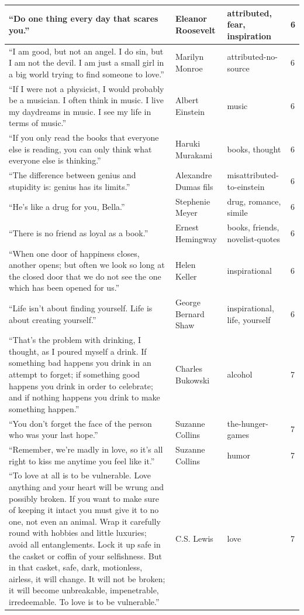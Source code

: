 \documentclass[
  letterpaper,
  DIV=11,
  numbers=noendperiod]{scrreprt}
\begin{document}
\begin{tabular}[t]{l|l|l|l}
\hline
“Do one thing every day that scares you.” & Eleanor Roosevelt & attributed, fear, inspiration & 6\\
\hline
“I am good, but not an angel. I do sin, but I am not the devil. I am just a small girl in a big world trying to find someone to love.” & Marilyn Monroe & attributed-no-source & 6\\
\hline
“If I were not a physicist, I would probably be a musician. I often think in music. I live my daydreams in music. I see my life in terms of music.” & Albert Einstein & music & 6\\
\hline
“If you only read the books that everyone else is reading, you can only think what everyone else is thinking.” & Haruki Murakami & books, thought & 6\\
\hline
“The difference between genius and stupidity is: genius has its limits.” & Alexandre Dumas fils & misattributed-to-einstein & 6\\
\hline
“He's like a drug for you, Bella.” & Stephenie Meyer & drug, romance, simile & 6\\
\hline
“There is no friend as loyal as a book.” & Ernest Hemingway & books, friends, novelist-quotes & 6\\
\hline
“When one door of happiness closes, another opens; but often we look so long at the closed door that we do not see the one which has been opened for us.” & Helen Keller & inspirational & 6\\
\hline
“Life isn't about finding yourself. Life is about creating yourself.” & George Bernard Shaw & inspirational, life, yourself & 6\\
\hline
“That's the problem with drinking, I thought, as I poured myself a drink. If something bad happens you drink in an attempt to forget; if something good happens you drink in order to celebrate; and if nothing happens you drink to make something happen.” & Charles Bukowski & alcohol & 7\\
\hline
“You don’t forget the face of the person who was your last hope.” & Suzanne Collins & the-hunger-games & 7\\
\hline
“Remember, we're madly in love, so it's all right to kiss me anytime you feel like it.” & Suzanne Collins & humor & 7\\
\hline
“To love at all is to be vulnerable. Love anything and your heart will be wrung and possibly broken. If you want to make sure of keeping it intact you must give it to no one, not even an animal. Wrap it carefully round with hobbies and little luxuries; avoid all entanglements. Lock it up safe in the casket or coffin of your selfishness. But in that casket, safe, dark, motionless, airless, it will change. It will not be broken; it will become unbreakable, impenetrable, irredeemable. To love is to be vulnerable.” & C.S. Lewis & love & 7\\

\end{tabular}
\end{document}

